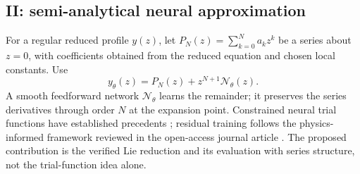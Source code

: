 \documentclass[12pt,a4paper]{article}
\begin{document}
\subsection*{II: semi-analytical neural approximation}
For a regular reduced profile $y(z)$, let $P_N(z)=\sum_{k=0}^{N}a_kz^k$ be a series about $z=0$, with coefficients obtained from the reduced equation and chosen local constants. Use
\begin{equation}
y_\theta(z)=P_N(z)+z^{N+1}\mathcal{N}_\theta(z).
\label{eq:trial}
\end{equation}
A smooth feedforward network $\mathcal{N}_\theta$ learns the remainder; it preserves the series derivatives through order $N$ at the expansion point. Constrained neural trial functions have established precedents \cite{lagaris}; residual training follows the physics-informed framework reviewed in the open-access journal article \cite{pinn}. The proposed contribution is the verified Lie reduction and its evaluation with series structure, not the trial-function idea alone.
\end{document}
